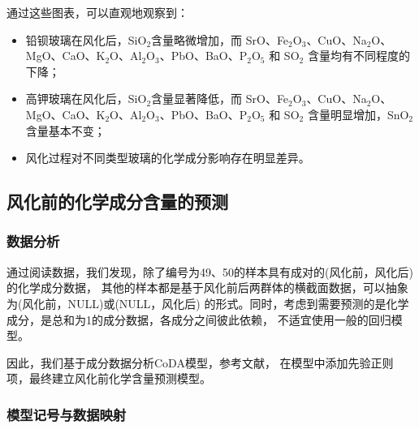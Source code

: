 \documentclass[withoutpreface,bwprint]{cumcmthesis}
\begin{document}
通过这些图表，可以直观地观察到：

\begin{itemize}
    \item 铅钡玻璃在风化后，SiO$_2$含量略微增加，而 SrO、Fe$_2$O$_3$、CuO、Na$_2$O、MgO、CaO、K$_2$O、Al$_2$O$_3$、PbO、BaO、P$_2$O$_5$ 和 SO$_2$ 含量均有不同程度的下降；
    \item 高钾玻璃在风化后，SiO$_2$含量显著降低，而 SrO、Fe$_2$O$_3$、CuO、Na$_2$O、MgO、CaO、K$_2$O、Al$_2$O$_3$、PbO、BaO、P$_2$O$_5$ 和 SO$_2$ 含量明显增加，SnO$_2$含量基本不变；
    \item 风化过程对不同类型玻璃的化学成分影响存在明显差异。
\end{itemize}

\subsection{风化前的化学成分含量的预测}

\subsubsection{数据分析}

通过阅读数据，我们发现，除了编号为49、50的样本具有成对的(风化前，风化后)的化学成分数据，
其他的样本都是基于风化前后两群体的横截面数据，可以抽象为(风化前，NULL)或(NULL，风化后)
的形式。同时，考虑到需要预测的是化学成分，是总和为1的成分数据，各成分之间彼此依赖，
不适宜使用一般的回归模型。

因此，我们基于成分数据分析CoDA模型，参考文献\cite{司守奎2011数学建模算法与应用}，
在模型中添加先验正则项，最终建立风化前化学含量预测模型。

\subsubsection{模型记号与数据映射}
\end{document}
